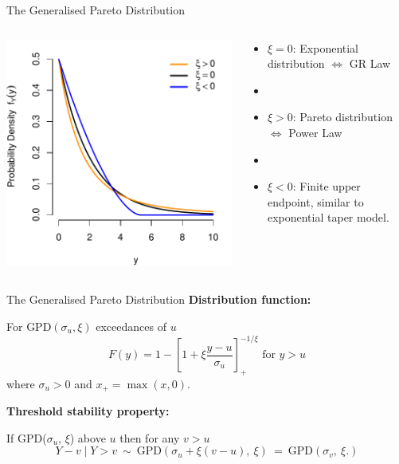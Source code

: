 \begin{frame}{The Generalised Pareto Distribution}   
\begin{columns}
\begin{column}{0.5\textwidth}
\vspace{3em}
\includegraphics[width = \textwidth]{gpd_densities.pdf}
\end{column}
\begin{column}{0.5\textwidth}
\begin{itemize}
    \item $\xi = 0$: Exponential distribution $\iff$ GR Law 
    \item [] 
    \item $\xi > 0$: Pareto
    distribution $\iff$ Power Law 
    \item [] 
    \item $\xi < 0$: Finite upper endpoint, similar to exponential taper model. 
\end{itemize}
\end{column}
\end{columns}
\end{frame}

\begin{frame}{The Generalised Pareto Distribution}
\textbf{Distribution function: }

For GPD$(\sigma_u,\xi)$ exceedances of $u$
\[
F(y)= 1-\left[1+\xi\frac{y-u}{\sigma_u}\right]_+^{-1/\xi}\mbox{ for }y>u
\]
where $\sigma_u>0$ and  $x_+=\max(x,0)$.

\vspace{2em}
\textbf{Threshold stability property:} 

If GPD($\sigma_u$, $\xi$) above $u$ then for any $v>u$
\[
Y - v \mid Y > v \ \sim \  \mbox{GPD}(\sigma_u+\xi(v-u), \ \xi) \ = \  \text{GPD}(\sigma_v,\ \xi.)
\]
\end{frame}

